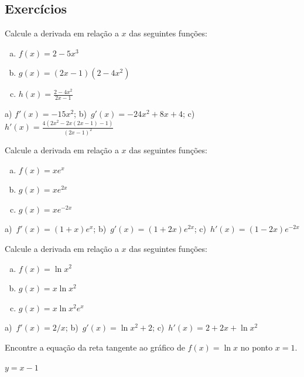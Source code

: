 \cleardoublepage\documentclass[../main.tex]{subfiles}
\begin{document}
\subsection{Exercícios}

\begin{exer}
  Calcule a derivada em relação a $x$ das seguintes funções:
  \begin{enumerate}[a)]
  \item $f(x) = 2 - 5x^3$ 
  \item $g(x) = (2x-1)(2-4x^2)$
  \item $h(x) = \frac{2-4x^2}{2x-1}$
  \end{enumerate}
\end{exer}
\begin{resp}
  a) $f'(x) = -15x^2$; b)~$g'(x)=- 24 x^{2} + 8 x + 4$; c)~$\displaystyle h'(x) = \frac{4 \left(2 x^{2} - 2 x \left(2 x - 1\right) - 1\right)}{\left(2 x - 1\right)^{2}}$
\end{resp}

\begin{exer}
  Calcule a derivada em relação a $x$ das seguintes funções:
  \begin{enumerate}[a)]
  \item $f(x) = xe^x$
  \item $g(x) = xe^{2x}$
  \item $g(x) = xe^{-2x}$
  \end{enumerate}
\end{exer}
\begin{resp}
  a)~$f'(x) = (1+x)e^x$; b)~$g'(x) = (1+2x)e^{2x}$; c)~$h'(x) = (1-2x)e^{-2x}$
\end{resp}

\begin{exer}
  Calcule a derivada em relação a $x$ das seguintes funções:
  \begin{enumerate}[a)]
  \item $f(x) = \ln x^2$
  \item $g(x) = x\ln x^2$
  \item $g(x) = x\ln x^2e^x$
  \end{enumerate}
\end{exer}
\begin{resp}
  a)~$f'(x) = 2/x$; b)~$g'(x) = \ln x^2 + 2$; c)~$h'(x) = 2+2x+\ln x^2$
\end{resp}

\begin{exer}
  Encontre a equação da reta tangente ao gráfico de $f(x) = \ln x$ no ponto $x=1$.
\end{exer}
\begin{resp}
  $y = x-1$
\end{resp}
\end{document}
